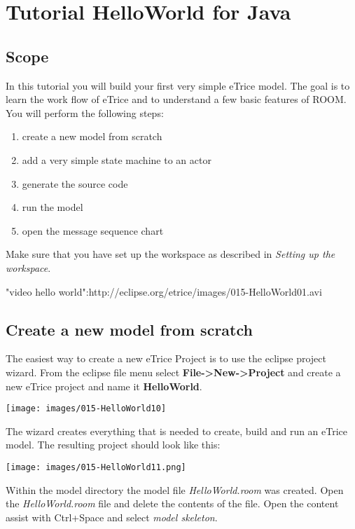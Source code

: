\chapter{Tutorial HelloWorld for Java}

\section{Scope}

In this tutorial you will build your first very simple eTrice model. The goal is to learn the work flow of eTrice and to understand a few basic features of ROOM. You will perform the following steps:

\begin{enumerate}
\item create a new model from scratch
\item add a very simple state machine to an actor
\item generate the source code
\item run the model
\item open the message sequence chart
\end{enumerate}

Make sure that you have set up the workspace as described in \textit{Setting up the workspace}.

"video hello world":http://eclipse.org/etrice/images/015-HelloWorld01.avi

\section{Create a new model from scratch}

The easiest way to create a new eTrice Project is to use the eclipse project wizard. From the eclipse file menu select \textbf{File->New->Project} and create a new eTrice project and name it \textbf{HelloWorld}.

\texttt{[image: images/015-HelloWorld10]}

The wizard creates everything that is needed to create, build and run an eTrice model. The resulting project should look like this:

\texttt{[image: images/015-HelloWorld11.png]}

Within the model directory the model file \textit{HelloWorld.room} was created. Open the \textit{HelloWorld.room} file and delete the contents of the file. Open the content assist with Ctrl+Space and select \textit{model skeleton}.

